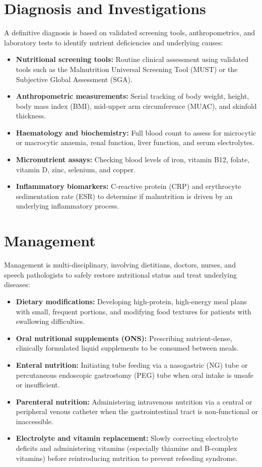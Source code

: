\section*{Diagnosis and Investigations}
A definitive diagnosis is based on validated screening tools, anthropometrics, and laboratory tests to identify nutrient deficiencies and underlying causes:
\begin{itemize}
    \item \textbf{Nutritional screening tools:} Routine clinical assessment using validated tools such as the Malnutrition Universal Screening Tool (MUST) or the Subjective Global Assessment (SGA).
    \item \textbf{Anthropometric measurements:} Serial tracking of body weight, height, body mass index (BMI), mid-upper arm circumference (MUAC), and skinfold thickness.
    \item \textbf{Haematology and biochemistry:} Full blood count to assess for microcytic or macrocytic anaemia, renal function, liver function, and serum electrolytes.
    \item \textbf{Micronutrient assays:} Checking blood levels of iron, vitamin B12, folate, vitamin D, zinc, selenium, and copper.
    \item \textbf{Inflammatory biomarkers:} C-reactive protein (CRP) and erythrocyte sedimentation rate (ESR) to determine if malnutrition is driven by an underlying inflammatory process.
\end{itemize}

\section*{Management}
Management is multi-disciplinary, involving dietitians, doctors, nurses, and speech pathologists to safely restore nutritional status and treat underlying diseases:
\begin{itemize}
    \item \textbf{Dietary modifications:} Developing high-protein, high-energy meal plans with small, frequent portions, and modifying food textures for patients with swallowing difficulties.
    \item \textbf{Oral nutritional supplements (ONS):} Prescribing nutrient-dense, clinically formulated liquid supplements to be consumed between meals.
    \item \textbf{Enteral nutrition:} Initiating tube feeding via a nasogastric (NG) tube or percutaneous endoscopic gastrostomy (PEG) tube when oral intake is unsafe or insufficient.
    \item \textbf{Parenteral nutrition:} Administering intravenous nutrition via a central or peripheral venous catheter when the gastrointestinal tract is non-functional or inaccessible.
    \item \textbf{Electrolyte and vitamin replacement:} Slowly correcting electrolyte deficits and administering vitamins (especially thiamine and B-complex vitamins) before reintroducing nutrition to prevent refeeding syndrome.
\end{itemize}


